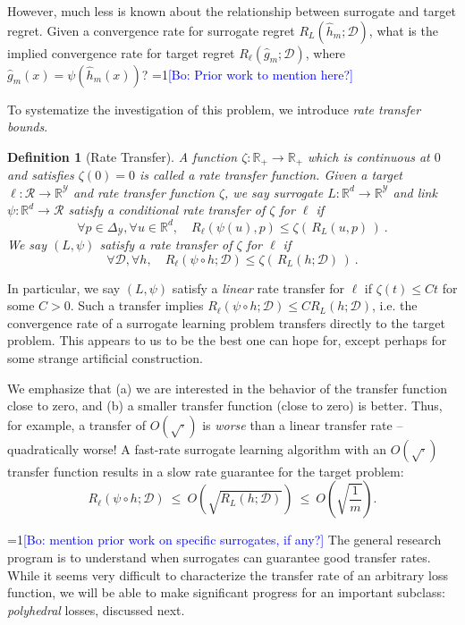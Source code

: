 \documentclass{article}
\newtheorem{definition}{Definition}
\newcommand{\Comments}{1}
\newcommand{\mynote}[2]{\ifnum\Comments=1\textcolor{#1}{#2}\fi}
\newcommand{\bo}[1]{\mynote{blue}{[Bo: #1]}}
\newcommand{\reals}{\mathbb{R}}
\newcommand{\simplex}{\Delta_\Y}
\newcommand{\D}{\mathcal{D}}
\newcommand{\R}{\mathcal{R}}
\newcommand{\Y}{\mathcal{Y}}
\begin{document}
However, much less is known about the relationship between surrogate and target regret.
Given a convergence rate for surrogate regret $R_L(\hat{h}_m;\D)$, what is the implied convergence rate for target regret $R_{\ell}(\hat{g}_m;\D)$, where $\hat{g}_m(x) = \psi(\hat{h}_m(x))$?
\bo{Prior work to mention here?}

To systematize the investigation of this problem, we introduce \emph{rate transfer bounds}.

\begin{definition}[Rate Transfer]\label{def:transfer}
  A function $\zeta : \reals_+ \to \reals_+$ which is continuous at $0$ and satisfies $\zeta(0) = 0$ is called a \emph{rate transfer function.}
	Given a target $\ell:\R\to\reals^\Y$ and rate transfer function $\zeta$, we say surrogate $L:\reals^d\to\reals^\Y$ and link $\psi : \reals^d \to \R$ satisfy a \emph{conditional rate transfer} of $\zeta$ for $\ell$ if
  \begin{equation}
    \label{eq:conditional-transfer}
    \forall p\in\simplex, \forall u\in\reals^d, \quad R_\ell(\psi(u),p) \leq \zeta(\, R_L(u,p) \,)~.
  \end{equation}
  We say $(L,\psi)$ satisfy a \emph{rate transfer} of $\zeta$ for $\ell$ if
  \begin{equation}
    \label{eq:transfer}
    \forall \D, \forall h, \quad R_\ell(\psi \circ h;\D) \leq \zeta(\, R_L(h;\D) \,)~.
  \end{equation}
\end{definition}
In particular, we say $(L,\psi)$ satisfy a \emph{linear} rate transfer for $\ell$ if $\zeta(t) \leq Ct$ for some $C > 0$.
Such a transfer implies $R_{\ell}(\psi \circ h;\D) \leq C R_L(h;\D)$, i.e. the convergence rate of a surrogate learning problem transfers directly to the target problem.
This appears to us to be the best one can hope for, except perhaps for some strange artificial construction.

We emphasize that (a) we are interested in the behavior of the transfer function close to zero, and (b) a smaller transfer function (close to zero) is better.
Thus, for example, a transfer of $O(\sqrt{\cdot})$ is \emph{worse} than a linear transfer rate -- quadratically worse!
A fast-rate surrogate learning algorithm with an $O(\sqrt{\cdot})$ transfer function results in a slow rate guarantee for the target problem:
  \[ R_{\ell}(\psi \circ h; \D) ~\leq~ O\left(\sqrt{R_L(h;\D)}\right) ~\leq~ O\left(\sqrt{\frac{1}{m}}\right) . \]

\bo{mention prior work on specific surrogates, if any?}
The general research program is to understand when surrogates can guarantee good transfer rates.
While it seems very difficult to characterize the transfer rate of an arbitrary loss function, we will be able to make significant progress for an important subclass: \emph{polyhedral} losses, discussed next.
\end{document}
